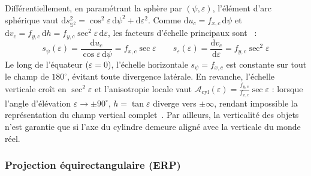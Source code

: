 \documentclass[11pt,a4paper]{article}
\begin{document}
Différentiellement, en  paramétrant la sphère par $(\psi, \varepsilon)$, l'élément d'arc sphérique vaut $\mathrm{d}s_{\mathbb{S}^2}^2 = \cos^2\varepsilon\,\mathrm{d}\psi^2 + \mathrm{d}\varepsilon^2$. Comme $\mathrm{d}u_c = f_{x,c}\,\mathrm{d}\psi$ et $\mathrm{d}v_c = f_{y,c}\,\mathrm{d}h = f_{y,c}\sec^2\varepsilon\,\mathrm{d}\varepsilon$, les facteurs d'échelle principaux sont~\cite{snyder1987} :
\begin{equation}
  s_\psi(\varepsilon) = \frac{\mathrm{d}u_c}{\cos\varepsilon\,\mathrm{d}\psi} = f_{x,c}\sec\varepsilon \qquad
  s_\varepsilon(\varepsilon) = \frac{\mathrm{d}v_c}{\mathrm{d}\varepsilon} = f_{y,c}\sec^2\varepsilon
\end{equation}
Le long de l'équateur ($\varepsilon = 0$), l'échelle horizontale $s_\psi = f_{x,c}$ est constante sur tout le champ de $180^\circ$, évitant toute divergence latérale. En revanche, l'échelle verticale croît en $\sec^2\varepsilon$ et l'anisotropie locale vaut $\mathcal{A}_{\text{cyl}}(\varepsilon) = \frac{f_{y,c}}{f_{x,c}}\sec\varepsilon$ : lorsque l'angle d'élévation $\varepsilon \to \pm 90^\circ$, $h = \tan\varepsilon$ diverge vers $\pm\infty$, rendant impossible la représentation du champ vertical complet~\cite{szeliski1997,snyder1987}. Par ailleurs, la verticalité des objets n'est garantie que si l'axe du cylindre demeure aligné avec la verticale du monde réel.

\subsubsection{Projection équirectangulaire (ERP)}
\end{document}

